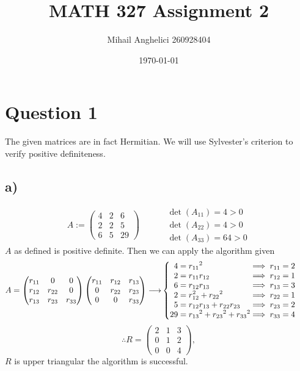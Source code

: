 \documentclass[12pt]{article}
\title{MATH 327 Assignment 2}
\author{Mihail Anghelici 260928404 }
\date{\today}
\theoremstyle{definition}
\theoremstyle{definition}
\theoremstyle{definition}
\theoremstyle{definition}
\theoremstyle{definition}
\theoremstyle{example}
\theoremstyle{note}
\theoremstyle{remark}
\theoremstyle{example}
\begin{document}
	\maketitle
	\section*{Question 1}
		The given matrices are in fact Hermitian. We will use Sylvester's criterion to verify positive definiteness. 
		\subsection*{a) }
			$$ A := \begin{pmatrix}
				4 & 2 & 6 \\ 2 & 2 & 5 \\ 6 & 5 & 29
			\end{pmatrix} \qquad 
			\begin{align*}
				&\det(A_{11}) = 4 > 0\\
				&\det(A_{22}) = 4 > 0\\
				&\det(A_{33}) = 64 >0
			\end{align*}$$
			$A$ as defined is positive definite. Then we can apply the algorithm given 
			\begin{align*} A = 
			\begin{pmatrix}
				r_{11} & 0 & 0 \\
				r_{12}	& r_{22} & 0 \\
				r_{13} & r_{23} & r_{33} 
			\end{pmatrix}
			\begin{pmatrix}
				r_{11} & r_{12} & r_{13} \\
				0 &r_{22} & r_{23} \\
				0 & 0 & r_{33}
			\end{pmatrix} \longrightarrow &
			\begin{cases}
				\begin{aligned}
				4 & = {r_{11}}^{2} &&\hspace{-1.3em}\implies r_{11} = 2\\
				2 &= r_{11} r_{12} &&\hspace{-1.3em}\implies r_{12}=1 \\
				6 &= r_{12}r_{13} &&\hspace{-1.3em}\implies r_{13} =3 \\
				 2 &= r_{{12}}^{2} + {r_{22}}^{2} &&\hspace{-1.3em}\implies r_{22} =1 \\
				5 &= r_{12} r_{13} + r_{22} r_{23} &&\hspace{-1.3em}\implies r_{23} =2 \\
				29 &= {r_{13}}^{2} + {r_{23}}^{2} + {r_{33}}^{2} &&\hspace{-1.3em}\implies r_{33} =4
			\end{aligned}
			\end{cases}
			\end{align*}
			$$ \therefore R = \begin{pmatrix}
			 2 & 1 & 3 \\ 0 & 1  & 2 \\ 0 & 0 &4
			\end{pmatrix}, $$
			$R$ is upper triangular the algorithm is successful. 
\end{document}
